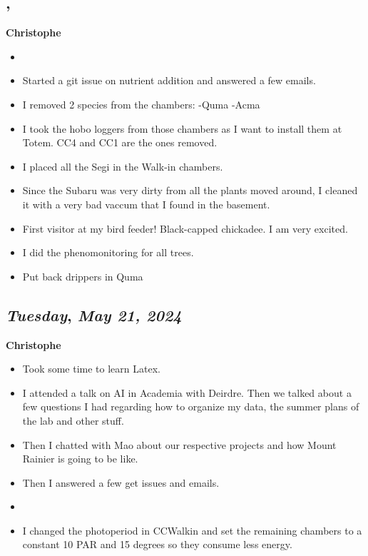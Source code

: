 \subsection*{\weekday, \day}
\textbf{Christophe}
\begin{itemize}
    \item 
    \item Started a git issue on nutrient addition and answered a few emails.
    \item I removed 2 species from the chambers: -Quma -Acma
    \item I took the hobo loggers from those chambers as I want to install them at Totem. CC4 and CC1 are the ones removed.
    \item I placed all the Segi in the Walk-in chambers.
    \item Since the Subaru was very dirty from all the plants moved around, I cleaned it with a very bad vaccum that I found in the basement.
    \item First visitor at my bird feeder! Black-capped chickadee. I am very excited.
    \item I did the phenomonitoring for all trees.
    \item Put back drippers in Quma
\end{itemize}

\def\day{\textit{May 21, 2024}}
\def\weekday{\textit{Tuesday}}
\subsection*{\weekday, \day}
\textbf{Christophe}
\begin{itemize}
    \item Took some time to learn Latex.
    \item I attended a talk on AI in Academia with Deirdre. Then we talked about a few questions I had regarding how to organize my data, the summer plans of the lab and other stuff.
    \item Then I chatted with Mao about our respective projects and how Mount Rainier is going to be like.
    \item Then I answered a few get issues and emails.
    \item 
    \item I changed the photoperiod in CCWalkin and set the remaining chambers to a constant 10 PAR and 15 degrees so they consume less energy.
\end{itemize}

\def\day{\textit{May 22, 2024}}
\def\weekday{\textit{Wednesday}}
